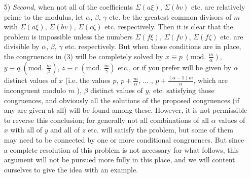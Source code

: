 \documentclass{book}
\theoremstyle{plain}
\theoremstyle{remark}
\newtheorem*{example}{Example}
\begin{document}
\begin{itemize}
 \textit{First}, when all of the congruences have coefficients $\Sigma(a\xi)$, $\Sigma(bv)$ etc. which are relatively prime to the modulus $m$, they can be solved according to the rules given before, and the complete solution of the problem will be given by congruences of the form $x \equiv p \; (\textrm{mod. }m)$, $y \equiv q \; (\textrm{mod. } m)$ etc. 

\begin{example} If the following congruences are proposed,
\[ x+ 3y + z \equiv 1\;, \;\; 4x + y + 5z \equiv 7\;,\;\; 2x+2y+z \equiv 3 \;(\textrm{mod. } 8) \]
then one finds $\xi=9$, $\xi'=1$, $\xi''=-14$, from which one derives $-15 x \equiv -26$, and therefore $x \equiv 6 \;(\textrm{mod. }8)$; in the same way it is found that $15y \equiv-4$, $15z \equiv 1$, and hence $y \equiv 4$, $z \equiv 7 \;(\textrm{mod. }8)$. \end{example}

\item[5)] \textit{Second}, when not all of the coefficients $\Sigma(a\xi)$, $\Sigma(bv)$ etc. are relatively prime to the modulus, let $\alpha$, $\beta$, $\gamma$ etc. be the greatest common divisors of $m$ with $\Sigma(a\xi)$, $\Sigma(bv)$, $\Sigma(c\zeta)$ etc. respectively.  Then it is clear that the problem is impossible unless the numbers $\Sigma(f\xi)$, $\Sigma(fv)$, $\Sigma(f\zeta)$ etc. are divisible by $\alpha$, $\beta$, $\gamma$ etc. respectively.  But when these conditions are in place, the congruences  in (3) will be completely solved by $x \equiv p\;(\textrm{mod. }\frac{m}{\alpha})$, $y \equiv q\;(\textrm{mod. }\frac{m}{\beta})$, $z \equiv r\;(\textrm{mod. }\frac{m}{\gamma})$ etc., or if you prefer will be given by $\alpha$ distinct values of $x$ (i.e. the values $p$, $p+\frac{m}{\alpha}$, ... , $p+ \frac{(\alpha-1)m}{\alpha}$, which are incongruent modulo $m$ ), $\beta$ distinct values of $y$, etc.  satisfying those congruences, and obviously all the solutions of the proposed congruences (if any are given at all) will be found among these.   However, it is not permissible to reverse this conclusion; for generally not all combinations of all $\alpha$ values of $x$ with all of $y$ and all of $z$ etc. will satisfy the problem, but some of them may need to be connected by one or more conditional congruences.  But since a complete resolution of this problem is not necessary for what follows, this argument will not be pursued more fully in this place, and we will content ourselves to give the idea with an example.
\end{itemize}
\end{document}

